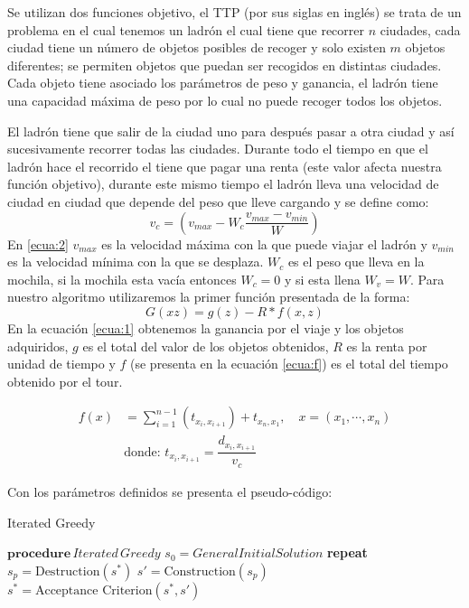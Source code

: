 \documentclass{article}
\theoremstyle{mytheoremstyle}
\theoremstyle{mytheoremstyle}
\theoremstyle{myproblemstyle}
\begin{document}
    Se utilizan dos funciones objetivo, el TTP (por sus siglas en inglés) se trata de un problema en el cual tenemos un ladrón el cual tiene que recorrer $n$ ciudades, cada ciudad tiene un número de objetos posibles de recoger y solo existen $m$ objetos diferentes; se permiten objetos que puedan ser recogidos en distintas ciudades. Cada objeto tiene asociado los parámetros de peso y ganancia, el ladrón tiene una capacidad máxima de peso por lo cual no puede recoger todos los objetos.
    
    El ladrón tiene que salir de la ciudad uno para después pasar a otra ciudad y así sucesivamente recorrer todas las ciudades. Durante todo el tiempo en que el ladrón hace el recorrido el tiene que pagar una renta (este valor afecta nuestra función objetivo), durante este mismo tiempo el ladrón lleva una velocidad de ciudad en ciudad que depende del peso que lleve cargando y se define como:
    \begin{equation}
    	v_c = \left( v_{max} - W_c \dfrac{v_{max} -  v_{min}}{W} \right) \label{ecua:2}
    \end{equation}
	En \ref{ecua:2} $v_{max}$ es la velocidad máxima con la que puede viajar el ladrón y $v_{min}$ es la velocidad mínima con la que se desplaza. $W_c$ es el peso que lleva en la mochila, si la mochila esta vacía entonces $W_c = 0$ y si esta llena $W_v = W$. 
     Para nuestro algoritmo utilizaremos la primer función presentada de la forma:
    \begin{equation}
    	G(xz) = g(z) - R*f(x,z) \label{ecua:1}
    \end{equation}
	En la ecuación \ref{ecua:1} obtenemos la ganancia por el viaje y los objetos adquiridos, $g$  es el total del valor de los objetos obtenidos, $R$ es la renta por unidad de tiempo y $f$ (se presenta en la ecuación \ref{ecua:f}) es el total del tiempo obtenido por el tour. 
	
	\begin{align}
		f(x) &= \sum_{i=1}^{n-1} \left( t_{x_i,x_{i+1}} \right) + t_{x_n,x_1}, \quad x= (x_1, \cdots, x_n) \label{ecua:f} \\
		& \text{donde: } t_{x_i,x_{i+1}} = \dfrac{d_{x_i,x_{i+1}}}{v_c} \nonumber 
	\end{align}

    Con los parámetros definidos se presenta el pseudo-código:
    \begin{algorithm}
    	\caption{Iterated Greedy}
    	\begin{algorithmic}[1]
    		\State $\textbf{procedure} \, Iterated \, Greedy$
    		\State \hspace{1cm} $s_0 = General InitialSolution$
    		\State \hspace{1cm} \textbf{repeat}
    		\State \hspace{1.5 cm} $s_p = \text{Destruction}(s^*)$
    		\State \hspace{1.5 cm} $s' = \text{Construction}(s_p)$
    		\State \hspace{1.5 cm} $s^* = \text{Acceptance Criterion}(s^*,s')$
    	\end{algorithmic}
    \end{algorithm}
    
\end{document}
